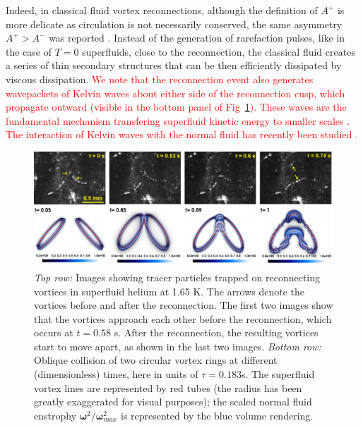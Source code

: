 \documentclass[9pt,twocolumn,twoside]{pnas-new}
\newcommand{\bom}{\boldsymbol{\omega}}
\def\red#1{\textcolor{red}{#1}}
\begin{document}
Indeed, in classical fluid vortex reconnections, although the definition of $A^+$ is more delicate as circulation is not necessarily conserved, the same asymmetry $A^+>A^-$ was reported \cite{yaoSeparationScalingViscous2020}. Instead of the generation of rarefaction pulses, like in the case of $T=0$ superfluids, close to the reconnection, the classical fluid creates a series of thin secondary structures that can be then efficiently dissipated by viscous dissipation.
\red{We note that the reconnection event also generates wavepackets of Kelvin waves about either side of the reconnection cusp, which propagate outward (visible in the bottom panel of Fig~\ref{fig:ring-coll-viz}). These waves are the fundamental mechanism transfering superfluid kinetic energy to smaller scales \cite{vinen2001decay,vinen2002quantum}. The interaction of Kelvin waves with the normal fluid has recently been studied \cite{stasiakCrossComponentEnergyTransfer2024,stasiak2025inverse}. }

\begin{figure}
	 \centering
	\includegraphics*[width=\textwidth]{snaps-combined.pdf}
	\caption{\emph{Top row:} Images showing tracer particles trapped on reconnecting vortices in superfluid helium at 1.65 K. The arrows denote the vortices before and after the reconnection. The first two images show that the vortices approach each other before the reconnection, which occurs at $t=0.58$ s. After the reconnection, the resulting vortices start to move apart, as shown in the last two images.
	\emph{Bottom row:} Oblique collision of two circular vortex rings at different 
	(dimensionless) times, here in units of $\tau=0.183$s.
	The superfluid vortex lines are represented by red tubes (the radius has been greatly 
	exaggerated for visual purposes); the scaled normal fluid enstrophy 
	$\bom^2/\bom^2_{max}$ is represented by the blue volume rendering.}
	\label{fig:ring-coll-viz}
\end{figure}
\end{document}
